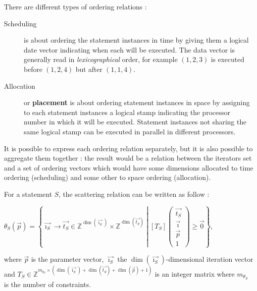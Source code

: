 \documentclass[paper=a4, fontsize=11.5pt]{scrartcl}
\numberwithin{equation}{section}        %
\numberwithin{figure}{section}          %
\numberwithin{table}{section}               %
\begin{document}
        There are different types of ordering relations :
        \begin{description}
            \item[Scheduling] is about ordering the statement instances in time by
                giving them a logical date vector indicating when each will be executed.
                The data vector is generally read in \textit{lexicographical} order, for example
                $(1,2,3)$ is executed before $(1,2,4)$ but after $(1,1,4)$.
            \item[Allocation] or \textbf{placement} is about ordering statement instances
                in space by assigning to each statement instances a logical stamp
                indicating the processor number in which it will be executed.
                Statement instances not sharing the same logical stamp can be
                executed in parallel in different processors.
        \end{description}

        It is possible to express each ordering relation separately,
        but it is also possible to aggregate them together : the result would be
        a relation between the iterators set and a set of ordering vectors which
        would have some dimensions allocated to time ordering (scheduling) and
        some other to space ordering (allocation).

        For a statement $S$, the scattering relation can be written as follow :
        \begin{center}
            $\theta_S(\vec{p}) = \left\{\vec{\imath_S} \to \vec{t_S} \in \mathbb{Z}^{\dim(\vec{\imath_S})}\times\mathbb{Z}^{\dim(\vec{t_S})}
            \middle|
            \left[T_S\right]\begin{pmatrix}\vec{t_S}\\ \vec{\imath} \\ \vec{p} \\ 1\end{pmatrix}
            \geq \vec{0}
            \right\}$,
        \end{center}
        where $\vec{p}$ is the parameter vector, $\vec{\imath_S}$ the $\dim(\vec{\imath_S})$-dimensional iteration vector
        and $T_S \in \mathbb{Z}^{m_{\theta_S}\times(\dim(\vec{\imath_S})+\dim(\vec{t_S})+\dim(\vec{p})+1)}$
        is an integer matrix where $m_{\theta_S}$ is the number of constraints.
\end{document}
